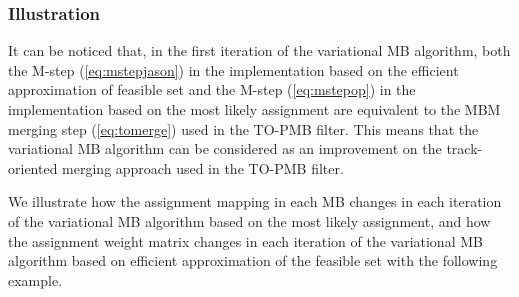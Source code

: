 \documentclass[journal]{IEEEtran}
\begin{document}
\subsubsection{Illustration}
It can be noticed that, in the first iteration of the variational MB algorithm, both the M-step (\ref{eq:mstepjason}) in the implementation based on the efficient approximation of feasible set and the M-step (\ref{eq:mstepop}) in the implementation based on the most likely assignment
are equivalent to the MBM merging step (\ref{eq:tomerge}) used in the TO-PMB filter. This means that the variational MB algorithm can be considered as an improvement on the track-oriented merging approach used in the TO-PMB filter.

We illustrate how the assignment mapping in each MB changes in each iteration of the variational MB algorithm based on the most likely assignment, and how the assignment weight matrix changes in each iteration of the variational MB algorithm based on efficient approximation of the feasible set with the following example. 
\end{document}
